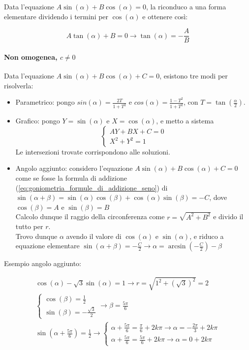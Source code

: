 Data l'equazione $A\sin(\alpha) + B\cos(\alpha) = 0$, la riconduco a una forma elementare dividendo i termini per $\cos(\alpha)$ e ottenere così:

\begin{equation}
    A\tan(\alpha)+B = 0 \rightarrow \tan(\alpha) = -\frac{A}{B}
\end{equation}

\paragraph{Non omogenea, $c \neq 0$}

Data l'equazione $A\sin(\alpha) + B\cos(\alpha) + C= 0$, esistono tre modi per risolverla:

\begin{itemize}
    \item Parametrico: pongo $sin(\alpha) = \frac{2T}{1+T^2}$ e $cos(\alpha) = \frac{1-T^2}{1+T^2}$, con $T = \tan(\frac{\alpha}{2})$.
    \item Grafico: pongo $Y =\sin(\alpha)$ e $X = \cos(\alpha)$, e metto a sistema
          \[
              \begin{cases}
                  AY + BX + C = 0 \\
                  X^2 + Y^2 = 1
              \end{cases}
          \]
          Le intersezioni trovate corrispondono alle soluzioni.
    \item Angolo aggiunto: considero l'equazione $A\sin(\alpha) + B\cos(\alpha) + C = 0$  come se fosse la formula di addizione (\ref{eq:goniometria_formule_di_addizione_seno}) di $\sin(\alpha + \beta) = \sin(\alpha)\cos(\beta)+\cos(\alpha)\sin(\beta) = - C$, dove $\cos(\beta) = A$ e $\sin(\beta) = B$ \\
          Calcolo dunque il raggio della circonferenza come $r = \sqrt{A^2 + B^2}$ e divido il tutto per $r$. \\
          Trovo dunque $\alpha$ avendo il valore di $\cos(\alpha)$ e $\sin(\alpha)$, e riduco a equazione elementare $\sin(\alpha + \beta) = -\frac{C}{2} \rightarrow \alpha = \arcsin(-\frac{C}{2}) - \beta$
\end{itemize}

Esempio angolo aggiunto:

\begin{gather}
    \cos(\alpha) - \sqrt{3}\sin(\alpha) = 1 \rightarrow r = \sqrt{1^2 + (\sqrt{3})^2} = 2 \\
    \begin{cases}
        \cos(\beta) = \frac{1}{2} \\
        \sin(\beta) = -\frac{\sqrt{3}}{2}
    \end{cases}
    \rightarrow \beta = \frac{5\pi}{6} \\
    \sin(\alpha + \frac{5\pi}{6}) = \frac{1}{2} \rightarrow \begin{cases}
        \alpha + \frac{5\pi}{6} = \frac{\pi}{6} + 2k\pi \rightarrow \alpha = -\frac{2\pi}{3} + 2k\pi \\
        \alpha + \frac{5\pi}{6} = \frac{5\pi}{6} + 2k\pi \rightarrow \alpha = 0 + 2k\pi
    \end{cases}
\end{gather}

